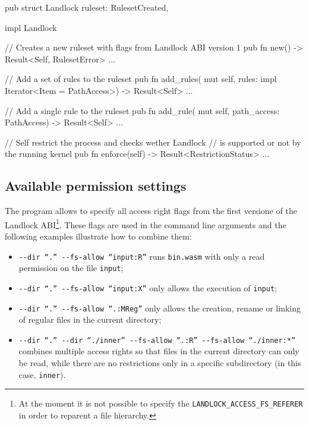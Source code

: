 \begin{code}[language=Rust, caption=The outline of the \texttt{landlock} module, label=lst:rust-landlock]
pub struct Landlock {
  ruleset: RulesetCreated,
}

impl Landlock {
  // Creates a new ruleset with flags from Landlock ABI version 1
  pub fn new() -> Result<Self, RulesetError> { ... }

  // Add a set of rules to the ruleset
  pub fn add_rules(
    mut self,
    rules: impl Iterator<Item = PathAccess>) -> Result<Self>
  { ... }

  // Add a single rule to the ruleset
  pub fn add_rule(
    mut self,
    path_access: PathAccess) -> Result<Self>
  { ... }

  // Self restrict the process and checks wether Landlock
  // is supported or not by the running kernel
  pub fn enforce(self) -> Result<RestrictionStatus> { ... }
}
\end{code}

\subsection{Available permission settings}

The program allows to specify all access right flags from the first versione of the Landlock
ABI\footnote{At the moment it is not possible to specify the \texttt{LANDLOCK\_ACCESS\_FS\_REFERER} in order to reparent a file hierarchy.}.
These flags are used in the command line arguments and the following examples illustrate how to combine them:
\begin{itemize}
  \item \texttt{-{}-dir ``.'' -{}-fs-allow ``input:R''} runs \texttt{bin.wasm} with only a read permission on the file \texttt{input};
  \item \texttt{-{}-dir ``.'' -{}-fs-allow ``input:X''} only allows the execution of \texttt{input};
  \item \texttt{-{}-dir ``.'' -{}-fs-allow ``.:MReg''} only allows the creation, rename or linking of regular files in the current directory;
  \item \texttt{-{}-dir ``.'' -{}-dir ``./inner'' -{}-fs-allow ``.:R'' -{}-fs-allow ``./inner:*''} combines multiple access rights so that
        files in the current directory can only be read, while there are no restrictions only in a specific subdirectory (in this case, \texttt{inner}).
\end{itemize}

